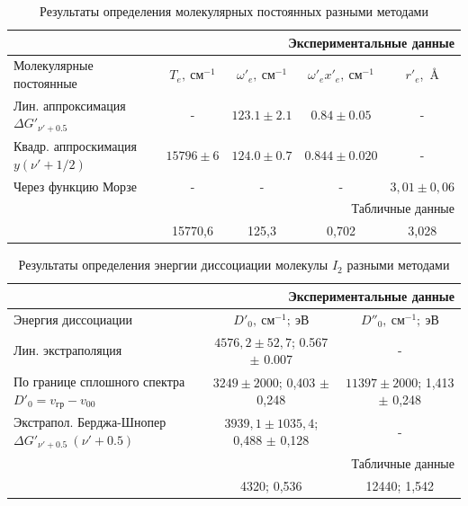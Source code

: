\documentclass{article}
\begin{document}
\begin{table}[h!]
    \centering
    \begin{tabular}{|l|c|c|c|c|} \hline  
               \multicolumn{5}{|r|}{Экспериментальные данные}\\ \hline  
           Молекулярные постоянные&$T_e,~см^{-1}$&  $\omega'_e,~см^{-1}$&  $\omega'_e x'_e,~см^{-1}$&  $r'_e$,~\(\text{\AA}\)\\ \hline  
               Лин. аппроксимация $\Delta G'_{\nu'+0.5}$&-&  $123.1 \pm 2.1$&  $0.84 \pm 0.05$&  -\\ \hline  
               Квадр. аппроскимация  $y (\nu' + 1/2)$&$15796 \pm 6$&  $124.0 \pm 0.7$&  $0.844 \pm 0.020$&  -\\ \hline 
 Через функцию Морзе& -& -& -&$3,01 \pm 0,06 $\\\hline \hline  
               \multicolumn{5}{|r|}{Табличные данные}\\ \hline  
               &15770,6&  125,3&  0,702&  3,028\\ \hline 
    \end{tabular}
   
    \caption  {Результаты определения молекулярных постоянных разными методами}
    \label{tab:results1}
\end{table}

\begin{table}[h!]
    \centering
    \begin{tabular}{|l|c|c|} \hline 
         \multicolumn{3}{|r|}{Экспериментальные данные}\\ \hline 
         Энергия диссоциации&  $D'_0,~см^{-1}; ~эВ$& $D''_0,~см^{-1};~эВ$\\ \hline 
         Лин. экстраполяция&  $4576,2 \pm 52,7$; 0.567 $\pm$ 0.007& -\\ \hline 
         По границе сплошного спектра $D'_0 = v_{гр} - v_{00}$&  $3249 \pm 2000$; 0,403 $\pm$ 0,248& $11397 \pm 2000$; 1,413 $\pm$  0,248\\ \hline 
 Экстрапол. Берджа-Шнопер $\Delta G'_{\nu'+0.5} ~(\nu' +0.5)$& $3939,1\pm1035,4$; 0,488 $\pm$ 0,128&-\\\hline \hline 
         \multicolumn{3}{|r|}{Табличные данные}\\ \hline 
         &  4320; 0,536& 12440;  1,542\\ \hline
    \end{tabular}
    \caption{Результаты определения энергии диссоциации молекулы $I_2$ разными методами}
    \label{tab:results2}
\end{table}
\end{document}
